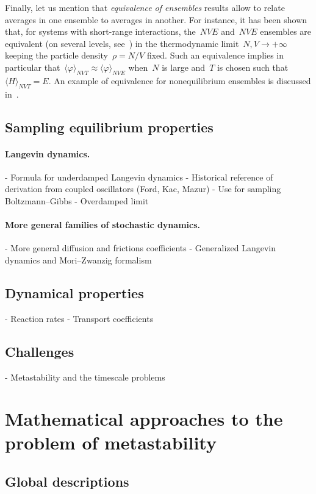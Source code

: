 Finally, let us mention that \textit{equivalence of ensembles} results allow to relate averages in one ensemble to averages in another. For instance, it has been shown that, for systems with short-range interactions, the~$NVE$ and~$NVE$ ensembles are equivalent (on several levels, see~\cite{T15}) in the thermodynamic limit~$N,V\to +\infty$ keeping the particle density~$\rho = N/V$ fixed.
Such an equivalence implies in particular that~$\langle\varphi\rangle_{NVT} \approx \langle \varphi\rangle_{NVE}$ when~$N$ is large and~$T$ is chosen such that~$\langle H\rangle_{NVT}=E$.
An example of equivalence for nonequilibrium ensembles is discussed in~\cite{CT13}.

\subsection{Sampling equilibrium properties}
\label{subsec:01:sampling}
\paragraph{Langevin dynamics.}
- Formula for underdamped Langevin dynamics
- Historical reference of derivation from coupled oscillators (Ford, Kac, Mazur)
- Use for sampling Boltzmann--Gibbs
- Overdamped limit

\paragraph{More general families of stochastic dynamics.}
- More general diffusion and frictions coefficients
- Generalized Langevin dynamics and Mori--Zwanzig formalism

\subsection{Dynamical properties}
- Reaction rates
- Transport coefficients

\subsection{Challenges}
- Metastability and the timescale problems

\section{Mathematical approaches to the problem of metastability}
\subsection{Global descriptions}
